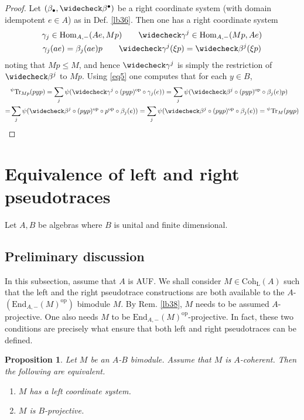 \documentclass[11pt,b5paper,notitlepage]{article}
\theoremstyle{definition}
\theoremstyle{plain}
\newtheorem{pp}[df]{Proposition}
\newcommand{\wch}{\widecheck}
\newcommand{\Tr}{\mathrm{Tr}}
\newcommand{\End}{\mathrm{End}} %
\newcommand{\Hom}{\mathrm{Hom}}
\newcommand{\opp}{\mathrm{op}}
\newcommand{\blt}{\bullet}
\newcommand{\Coh}{\mathrm{Coh}_{\mathrm L}}
\numberwithin{equation}{section}
\begin{document}
\begin{proof}
Let $(\beta_\blt,\wch\beta^\blt)$ be a right coordinate system (with domain idempotent $e\in A$) as in Def. \ref{lb36}. Then one has a right coordinate system
\begin{gather*}
\gamma_j\in\Hom_{A,-}(Ae,Mp)\qquad \wch\gamma^j\in \Hom_{A,-}(Mp,Ae)\\
\gamma_j(ae)=\beta_j(ae)p\qquad \wch\gamma^j(\xi p)=\wch\beta^j(\xi p)
\end{gather*}
noting that $Mp\leq M$, and hence $\wch\gamma^j$ is simply the restriction of $\wch\beta^j$ to $Mp$. Using \eqref{eq5} one computes that for each $y\in B$,
\begin{align*}
&{}^\psi\Tr_{Mp}(pyp)=\sum_j \psi(\wch\gamma^j\circ (pyp)^\opp\circ \gamma_j(e))=\sum_j \psi(\wch\beta^j\circ (pyp)^\opp\circ \beta_j(e)p)\\
=&\sum_j \psi(\wch\beta^j\circ (pyp)^\opp\circ p^\opp\circ\beta_j(e))=\sum_j \psi(\wch\beta^j\circ (pyp)^\opp\circ\beta_j(e))={}^\psi\Tr_M(pyp)
\end{align*}
\end{proof}






\section{Equivalence of left and right pseudotraces}

Let $A,B$ be algebras where $B$ is unital and finite dimensional.


\subsection{Preliminary discussion}

In this subsection, assume that $A$ is AUF. We shall consider $M\in\Coh(A)$ such that the left and the right pseudotrace constructions are both available to the $A$-$(\End_{A,-}(M)^\opp)$ bimodule $M$. By Rem. \ref{lb38}, $M$ needs to be assumed  $A$-projective. One also needs $M$ to be $\End_{A,-}(M)^\opp$-projective. In fact, these two conditions are precisely what ensure that both left and right pseudotraces can be defined.

\begin{pp}
Let $M$ be an $A$-$B$ bimodule. Assume that $M$ is $A$-coherent. Then the following are equivalent.
\begin{enumerate}[label=(\arabic*)]
\item $M$ has a left coordinate system.
\item $M$ is $B$-projective.
\end{enumerate}
\end{pp}
\end{document}
